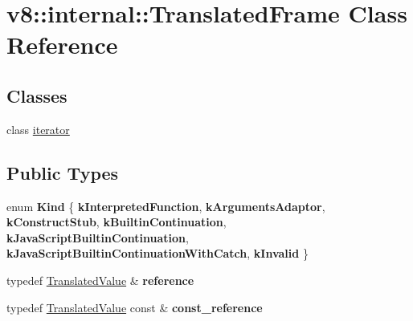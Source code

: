 \hypertarget{classv8_1_1internal_1_1TranslatedFrame}{}\section{v8\+:\+:internal\+:\+:Translated\+Frame Class Reference}
\label{classv8_1_1internal_1_1TranslatedFrame}
\subsection*{Classes}
\begin{DoxyCompactItemize}
\item 
class \mbox{\hyperlink{classv8_1_1internal_1_1TranslatedFrame_1_1iterator}{iterator}}
\end{DoxyCompactItemize}
\subsection*{Public Types}
\begin{DoxyCompactItemize}
\item 
\mbox{\label{classv8_1_1internal_1_1TranslatedFrame_aa6931f8e7c4e1e1bf42252d1d8e1bf9d}} 
enum {\bfseries Kind} \{ \newline
{\bfseries k\+Interpreted\+Function}, 
{\bfseries k\+Arguments\+Adaptor}, 
{\bfseries k\+Construct\+Stub}, 
{\bfseries k\+Builtin\+Continuation}, 
\newline
{\bfseries k\+Java\+Script\+Builtin\+Continuation}, 
{\bfseries k\+Java\+Script\+Builtin\+Continuation\+With\+Catch}, 
{\bfseries k\+Invalid}
 \}
\item 
\mbox{\label{classv8_1_1internal_1_1TranslatedFrame_a729f1e8f225634f1ecf4e88e93ed70ae}} 
typedef \mbox{\hyperlink{classv8_1_1internal_1_1TranslatedValue}{Translated\+Value}} \& {\bfseries reference}
\item 
\mbox{\label{classv8_1_1internal_1_1TranslatedFrame_a598659983fe92a1b0f6853c97582c5cc}} 
typedef \mbox{\hyperlink{classv8_1_1internal_1_1TranslatedValue}{Translated\+Value}} const  \& {\bfseries const\+\_\+reference}
\end{DoxyCompactItemize}
